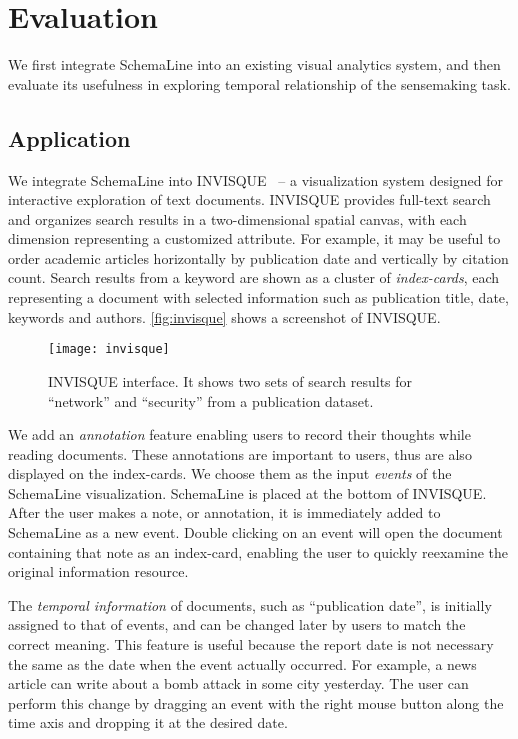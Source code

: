 \section{Evaluation}
We first integrate SchemaLine into an existing visual analytics system, and then evaluate its usefulness in exploring temporal relationship of the sensemaking task.

\subsection{Application}
We integrate SchemaLine into INVISQUE~\cite{Wong2011} -- a visualization system designed for interactive exploration of text documents. INVISQUE provides full-text search and organizes search results in a two-dimensional spatial canvas, with each dimension representing a customized attribute. For example, it may be useful to order academic articles horizontally by publication date and vertically by citation count. Search results from a keyword are shown as a cluster of \emph{index-cards}, each representing a document with selected information such as publication title, date, keywords and authors. \autoref{fig:invisque} shows a screenshot of INVISQUE.

\begin{figure}[!htb]
	\centering
	\texttt{[image: invisque]}
	\caption{INVISQUE interface. It shows two sets of search results for ``network'' and ``security'' from a publication dataset.}
	\label{fig:invisque}
\end{figure}

We add an \emph{annotation} feature enabling users to record their thoughts while reading documents. These annotations are important to users, thus are also displayed on the index-cards. We choose them as the input \emph{events} of the SchemaLine visualization. SchemaLine is placed at the bottom of INVISQUE. After the user makes a note, or annotation, it is immediately added to SchemaLine as a new event. Double clicking on an event will open the document containing that note as an index-card, enabling the user to quickly reexamine the original information resource.

The \emph{temporal information} of documents, such as ``publication date'', is initially assigned to that of events, and can be changed later by users to match the correct meaning. This feature is useful because the report date is not necessary the same as the date when the event actually occurred. For example, a news article can write about a bomb attack in some city yesterday. The user can perform this change by dragging an event with the right mouse button along the time axis and dropping it at the desired date. 

